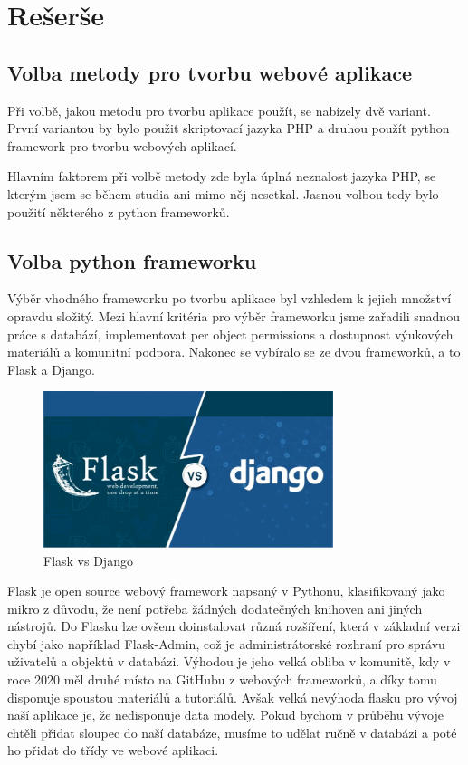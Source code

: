\chapter{Rešerše}
\label{1-reserse}

\section{Volba metody pro tvorbu webové aplikace}


Při volbě, jakou metodu pro tvorbu aplikace použít, se nabízely dvě
variant. První variantou by bylo použit skriptovací jazyka PHP a
druhou použít python framework pro tvorbu webových aplikací.

Hlavním faktorem při volbě metody zde byla úplná neznalost jazyka PHP,
se kterým jsem se během studia ani mimo něj nesetkal. Jasnou volbou
tedy bylo použití některého z python frameworků.

\section{Volba python frameworku}
Výběr vhodného frameworku po tvorbu aplikace byl vzhledem k jejich
množství opravdu složitý. Mezi hlavní kritéria pro výběr frameworku
jsme zařadili snadnou práce s databází, implementovat per object
permissions a dostupnost výukových materiálů a komunitní
podpora. Nakonec se vybíralo se ze dvou frameworků, a to Flask a
Django.

\begin{figure}[H] \centering
    \includegraphics[width=240pt]{./pictures/1-django-vs-flask.jpeg}
    \caption[Flask vs Django]{Flask vs Django \cite{}}
	\label{fig:Flask vs Django}                                
\end{figure}

Flask je open source webový framework napsaný v Pythonu, klasifikovaný
jako mikro z důvodu, že není potřeba žádných dodatečných knihoven ani
jiných nástrojů. Do Flasku lze ovšem doinstalovat různá rozšíření,
která v základní verzi chybí jako například Flask-Admin, což je
administrátorské rozhraní pro správu uživatelů a objektů v
databázi. Výhodou je jeho velká obliba v komunitě, kdy v roce 2020 měl
druhé místo na GitHubu z webových frameworků, a díky tomu disponuje
spoustou materiálů a tutoriálů. Avšak velká nevýhoda flasku pro vývoj
naší aplikace je, že nedisponuje data modely. Pokud bychom v průběhu
vývoje chtěli přidat sloupec do naší databáze, musíme to udělat ručně
v databázi a poté ho přidat do třídy ve webové aplikaci.

